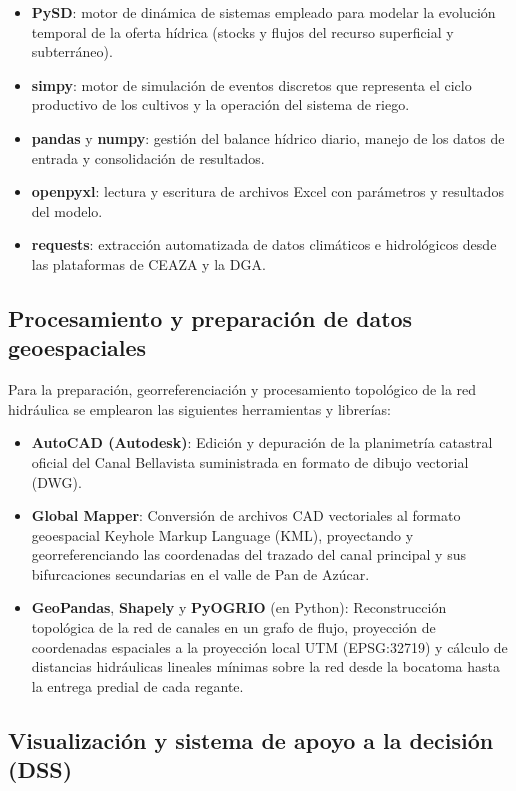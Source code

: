 \documentclass[12pt]{report}
\begin{document}
\begin{itemize}
    \item \textbf{PySD}: motor de dinámica de sistemas empleado para modelar la evolución temporal de la oferta hídrica (stocks y flujos del recurso superficial y subterráneo).
    \item \textbf{simpy}: motor de simulación de eventos discretos que representa el ciclo productivo de los cultivos y la operación del sistema de riego.
    \item \textbf{pandas} y \textbf{numpy}: gestión del balance hídrico diario, manejo de los datos de entrada y consolidación de resultados.
    \item \textbf{openpyxl}: lectura y escritura de archivos Excel con parámetros y resultados del modelo.
    \item \textbf{requests}: extracción automatizada de datos climáticos e hidrológicos desde las plataformas de CEAZA y la DGA.
\end{itemize}

\subsection*{Procesamiento y preparación de datos geoespaciales}

Para la preparación, georreferenciación y procesamiento topológico de la red hidráulica se emplearon las siguientes herramientas y librerías:

\begin{itemize}
    \item \textbf{AutoCAD (Autodesk)}: Edición y depuración de la planimetría catastral oficial del Canal Bellavista suministrada en formato de dibujo vectorial (DWG).
    \item \textbf{Global Mapper}: Conversión de archivos CAD vectoriales al formato geoespacial Keyhole Markup Language (KML), proyectando y georreferenciando las coordenadas del trazado del canal principal y sus bifurcaciones secundarias en el valle de Pan de Azúcar.
    \item \textbf{GeoPandas}, \textbf{Shapely} y \textbf{PyOGRIO} (en Python): Reconstrucción topológica de la red de canales en un grafo de flujo, proyección de coordenadas espaciales a la proyección local UTM (EPSG:32719) y cálculo de distancias hidráulicas lineales mínimas sobre la red desde la bocatoma hasta la entrega predial de cada regante.
\end{itemize}

\subsection*{Visualización y sistema de apoyo a la decisión (DSS)}
\end{document}
